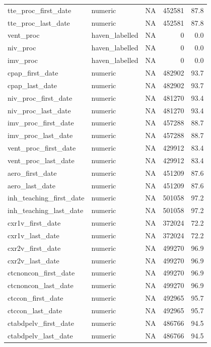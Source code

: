 \documentclass[
  11pt,
  letterpaper,
  DIV=11,
  numbers=noendperiod]{scrartcl}
\begin{document}
\begin{longtable*}{llrrr}
tte\_proc\_first\_date & numeric & NA & 452581 & 87.8\\
\addlinespace
tte\_proc\_last\_date & numeric & NA & 452581 & 87.8\\
vent\_proc & haven\_labelled & NA & 0 & 0.0\\
niv\_proc & haven\_labelled & NA & 0 & 0.0\\
imv\_proc & haven\_labelled & NA & 0 & 0.0\\
cpap\_first\_date & numeric & NA & 482902 & 93.7\\
\addlinespace
cpap\_last\_date & numeric & NA & 482902 & 93.7\\
niv\_proc\_first\_date & numeric & NA & 481270 & 93.4\\
niv\_proc\_last\_date & numeric & NA & 481270 & 93.4\\
imv\_proc\_first\_date & numeric & NA & 457288 & 88.7\\
imv\_proc\_last\_date & numeric & NA & 457288 & 88.7\\
\addlinespace
vent\_proc\_first\_date & numeric & NA & 429912 & 83.4\\
vent\_proc\_last\_date & numeric & NA & 429912 & 83.4\\
aero\_first\_date & numeric & NA & 451209 & 87.6\\
aero\_last\_date & numeric & NA & 451209 & 87.6\\
inh\_teaching\_first\_date & numeric & NA & 501058 & 97.2\\
\addlinespace
inh\_teaching\_last\_date & numeric & NA & 501058 & 97.2\\
cxr1v\_first\_date & numeric & NA & 372024 & 72.2\\
cxr1v\_last\_date & numeric & NA & 372024 & 72.2\\
cxr2v\_first\_date & numeric & NA & 499270 & 96.9\\
cxr2v\_last\_date & numeric & NA & 499270 & 96.9\\
\addlinespace
ctcnoncon\_first\_date & numeric & NA & 499270 & 96.9\\
ctcnoncon\_last\_date & numeric & NA & 499270 & 96.9\\
ctccon\_first\_date & numeric & NA & 492965 & 95.7\\
ctccon\_last\_date & numeric & NA & 492965 & 95.7\\
ctabdpelv\_first\_date & numeric & NA & 486766 & 94.5\\
\addlinespace
ctabdpelv\_last\_date & numeric & NA & 486766 & 94.5\\

\end{longtable*}
\end{document}
